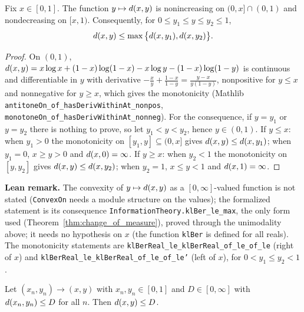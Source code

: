 \begin{lemma}\label{lem:pinfo_klbin_convex_right}
\leanok
{}
Fix $x \in [0, 1]$. The function $y \mapsto d(x, y)$ is nonincreasing on $(0, x] \cap (0,1)$
and nondecreasing on $[x, 1)$. Consequently, for $0 \le y_1 \le y \le y_2 \le 1$,
\[
  d(x, y) \le \max\big\{d(x, y_1), d(x, y_2)\big\}.
\]
\end{lemma}

\begin{proof}
\leanok
On $(0, 1)$, $d(x, y) = x\log x + (1-x)\log(1-x) - x\log y - (1-x)\log(1-y)$ is continuous
and differentiable in $y$ with derivative $-\frac{x}{y} + \frac{1-x}{1-y} = \frac{y - x}{y(1-y)}$,
nonpositive for $y \le x$ and nonnegative for $y \ge x$, which gives the monotonicity (Mathlib
\texttt{antitoneOn\_of\_hasDerivWithinAt\_nonpos}, \texttt{monotoneOn\_of\_hasDerivWithinAt\_nonneg}).
For the consequence, if $y = y_1$ or $y = y_2$ there is nothing to prove, so let
$y_1 < y < y_2$, hence $y \in (0,1)$. If $y \le x$: when $y_1 > 0$ the monotonicity on
$[y_1, y] \subseteq (0, x]$ gives $d(x, y) \le d(x, y_1)$; when $y_1 = 0$, $x \ge y > 0$
and $d(x, 0) = \infty$. If $y \ge x$: when $y_2 < 1$ the monotonicity on $[y, y_2]$ gives
$d(x, y) \le d(x, y_2)$; when $y_2 = 1$, $x \le y < 1$ and $d(x, 1) = \infty$.
\end{proof}

\textbf{Lean remark.} The convexity of $y \mapsto d(x,y)$ as a $[0,\infty]$-valued function
is not stated (\texttt{ConvexOn} needs a module structure on the values); the formalized statement
is its consequence \texttt{InformationTheory.klBer\_le\_max}, the only form used
(Theorem~\ref{thm:change_of_measure}), proved through the unimodality above; it needs no
hypothesis on $x$ (the function \texttt{klBer} is defined for all reals). The monotonicity
statements are \texttt{klBerReal\_le\_klBerReal\_of\_le\_of\_le} (right of $x$) and
\texttt{klBerReal\_le\_klBerReal\_of\_le\_of\_le'} (left of $x$), for $0 < y_1 \le y_2 < 1$.

\begin{lemma}\label{lem:pinfo_klbin_lsc}
\leanok
{}
Let $(x_n, y_n) \to (x, y)$ with $x_n, y_n \in [0, 1]$ and $D \in [0, \infty]$ with
$d(x_n, y_n) \le D$ for all $n$. Then $d(x, y) \le D$.
\end{lemma}

